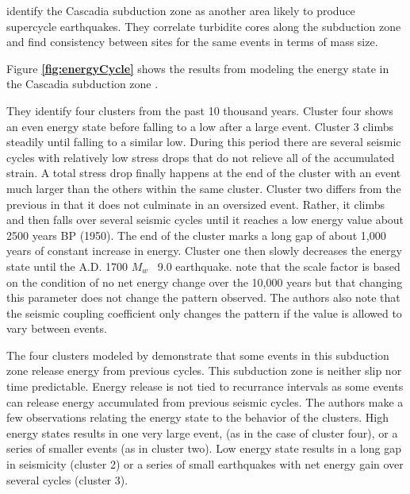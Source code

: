 \documentclass[draft,jgrga]{agutex}
\begin{document}
\citet{Goldfinger2013} identify the Cascadia subduction zone as another area likely to produce supercycle earthquakes. They correlate turbidite cores along the subduction zone and find consistency between sites for the same events in terms of mass size. 

Figure {\bf \ref{fig:energyCycle}} shows the results from modeling the energy state in the Cascadia subduction zone \citep{Goldfinger2013}. 

They identify four clusters from the past 10 thousand years. Cluster four shows an even energy state before falling to a low after a large event. Cluster 3 climbs steadily until falling to a similar low. During this period there are several seismic cycles with relatively low stress drops that do not relieve all of the accumulated strain. A total stress drop finally happens at the end of the cluster with an event much larger than the others within the same cluster. Cluster two differs from the previous in that it does not culminate in an oversized event. Rather, it climbs and then falls over several seismic cycles until it reaches a low energy value about 2500 years BP (1950). The end of the cluster marks a long gap of about 1,000 years of constant increase in energy. Cluster one then slowly decreases the energy state until the A.D. 1700 $M_w$ ~9.0 earthquake. \citep{Goldfinger2013} note that the scale factor is based on the condition of no net energy change over the 10,000 years but that changing this parameter does not change the pattern observed. The authors also note that the seismic coupling coefficient only changes the pattern if the value is allowed to vary between events. 

The four clusters modeled by \citet{Goldfinger2013} demonstrate that some events in this subduction zone release energy from previous cycles. This subduction zone is neither slip nor time predictable. Energy release is not tied to recurrance intervals as some events can release energy accumulated from previous seismic cycles. The authors make a few observations relating the energy state to the behavior of the clusters. High energy states results in one very large event, (as in the case of cluster four), or a series of smaller events (as in cluster two). Low energy state results in a long gap in seismicity (cluster 2) or a series of small earthquakes with net energy gain over several cycles (cluster 3). 
\end{document}
